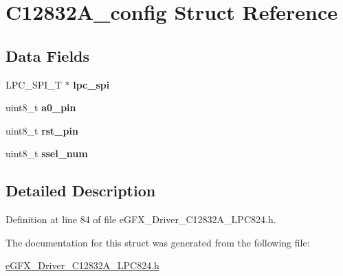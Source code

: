 \hypertarget{structC12832A__config}{}\section{C12832\+A\+\_\+config Struct Reference}
\label{structC12832A__config}
\subsection*{Data Fields}
\begin{DoxyCompactItemize}
\item 
L\+P\+C\+\_\+\+S\+P\+I\+\_\+T $\ast$ {\bfseries lpc\+\_\+spi}\hypertarget{structC12832A__config_ac564ed12472e3c7f1d5d53f3ad650b0a}{}\label{structC12832A__config_ac564ed12472e3c7f1d5d53f3ad650b0a}

\item 
uint8\+\_\+t {\bfseries a0\+\_\+pin}\hypertarget{structC12832A__config_a37fea61d5b6d4f639cd3e9d2b757d0fa}{}\label{structC12832A__config_a37fea61d5b6d4f639cd3e9d2b757d0fa}

\item 
uint8\+\_\+t {\bfseries rst\+\_\+pin}\hypertarget{structC12832A__config_a00a7e26c38945362ba76d3cadf40763d}{}\label{structC12832A__config_a00a7e26c38945362ba76d3cadf40763d}

\item 
uint8\+\_\+t {\bfseries ssel\+\_\+num}\hypertarget{structC12832A__config_afbd3f1c01d74289465b28f40cb2c4cf4}{}\label{structC12832A__config_afbd3f1c01d74289465b28f40cb2c4cf4}

\end{DoxyCompactItemize}


\subsection{Detailed Description}


Definition at line 84 of file e\+G\+F\+X\+\_\+\+Driver\+\_\+\+C12832\+A\+\_\+\+L\+P\+C824.\+h.



The documentation for this struct was generated from the following file\+:\begin{DoxyCompactItemize}
\item 
\hyperlink{eGFX__Driver__C12832A__LPC824_8h}{e\+G\+F\+X\+\_\+\+Driver\+\_\+\+C12832\+A\+\_\+\+L\+P\+C824.\+h}\end{DoxyCompactItemize}
